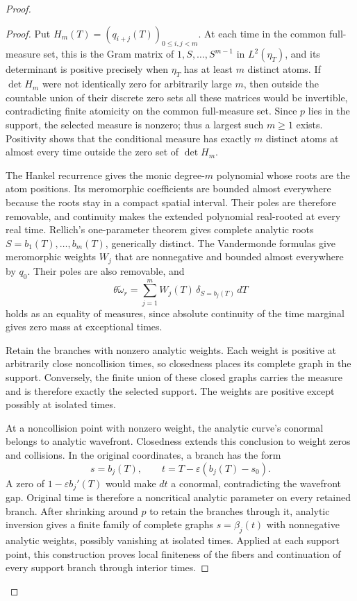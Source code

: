 \documentclass[11pt]{article}
\begin{document}
\begin{proof}
\begin{proof}
Put $H_m(T)=(q_{i+j}(T))_{0\le i,j<m}$. At each time in the common full-measure set, this is the Gram matrix of $1,S,\ldots,S^{m-1}$ in $L^2(\eta_T)$, and its determinant is positive precisely when $\eta_T$ has at least $m$ distinct atoms. If $\det H_m$ were not identically zero for arbitrarily large $m$, then outside the countable union of their discrete zero sets all these matrices would be invertible, contradicting finite atomicity on the common full-measure set. Since $p$ lies in the support, the selected measure is nonzero; thus a largest such $m\ge1$ exists. Positivity shows that the conditional measure has exactly $m$ distinct atoms at almost every time outside the zero set of $\det H_m$.

The Hankel recurrence gives the monic degree-$m$ polynomial whose roots are the atom positions. Its meromorphic coefficients are bounded almost everywhere because the roots stay in a compact spatial interval. Their poles are therefore removable, and continuity makes the extended polynomial real-rooted at every real time. Rellich's one-parameter theorem \cite[Theorem 3.4]{KP} gives complete analytic roots $S=b_1(T),\ldots,b_m(T)$, generically distinct. The Vandermonde formulas give meromorphic weights $W_j$ that are nonnegative and bounded almost everywhere by $q_0$. Their poles are also removable, and
\[
 \theta\widetilde\omega_r=
 \sum_{j=1}^m W_j(T)\,\delta_{S=b_j(T)}\,dT
\]
holds as an equality of measures, since absolute continuity of the time marginal gives zero mass at exceptional times.

Retain the branches with nonzero analytic weights. Each weight is positive at arbitrarily close noncollision times, so closedness places its complete graph in the support. Conversely, the finite union of these closed graphs carries the measure and is therefore exactly the selected support. The weights are positive except possibly at isolated times.

At a noncollision point with nonzero weight, the analytic curve's conormal belongs to analytic wavefront. Closedness extends this conclusion to weight zeros and collisions. In the original coordinates, a branch has the form
\[
 s=b_j(T),\qquad t=T-\varepsilon(b_j(T)-s_0).
\]
A zero of $1-\varepsilon b_j'(T)$ would make $dt$ a conormal, contradicting the wavefront gap. Original time is therefore a noncritical analytic parameter on every retained branch. After shrinking around $p$ to retain the branches through it, analytic inversion gives a finite family of complete graphs $s=\beta_j(t)$ with nonnegative analytic weights, possibly vanishing at isolated times. Applied at each support point, this construction proves local finiteness of the fibers and continuation of every support branch through interior times.


\end{proof}
\end{proof}
\end{document}
